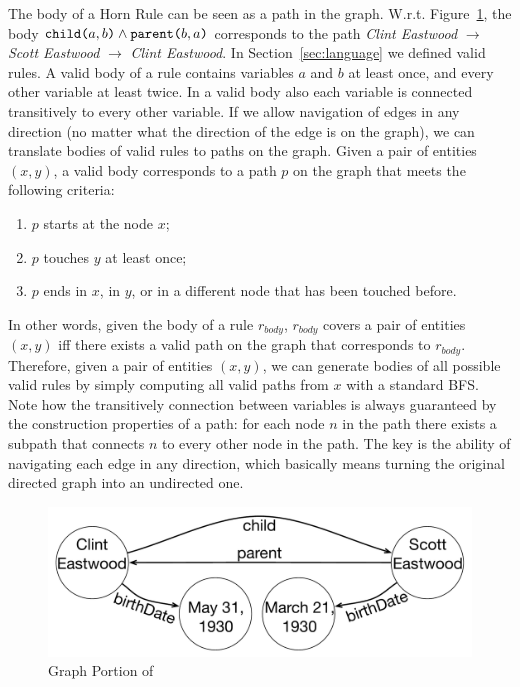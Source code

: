 The body of a Horn Rule can be seen as a path in the graph. W.r.t. Figure~\ref{fig:graph_example}, the body $\texttt{child(}a,b\texttt{)} \wedge \texttt{parent(}b,a\texttt{)}$ corresponds to the path \textit{Clint Eastwood} $\rightarrow$ \textit{Scott Eastwood} $\rightarrow$ \textit{Clint Eastwood}. In Section~\ref{sec:language} we defined valid rules. A valid body of a rule contains variables $a$ and $b$ at least once, and every other variable at least twice. 
In a valid body also each variable is connected transitively to every other variable. 
If we allow navigation of edges in any direction (no matter what the direction of the edge is on the graph), we can translate bodies of valid rules to paths on the graph.
Given a pair of entities $(x,y)$, a valid body corresponds to a path $p$ on the graph that meets the following criteria:
\begin{enumerate}
	\item $p$ starts at the node $x$;
	\item $p$ touches $y$ at least once;
	\item $p$ ends in $x$, in $y$, or in a different node that has been touched before.
\end{enumerate}
In other words, given the body of a rule $r_{body}$, $r_{body}$ covers a pair of entities $(x,y)$ iff there exists a valid path on the graph that corresponds to $r_{body}$. Therefore, given a pair of entities $(x,y)$, we can generate bodies of all possible valid rules by simply computing all valid paths from $x$ with a standard BFS. Note how the transitively connection between variables is always guaranteed by the construction properties of a path: for each node $n$ in the path there exists a subpath that connects $n$ to every other node in the path. The key is the ability of navigating each edge in any direction, which basically means turning the original directed graph into an undirected one.

\begin{figure}[t]
	\centering
	\includegraphics[width=\columnwidth]{include/figure/graph_example.pdf}
	\caption{Graph Portion of \dbpedia}
	\label{fig:graph_example}
\end{figure}

